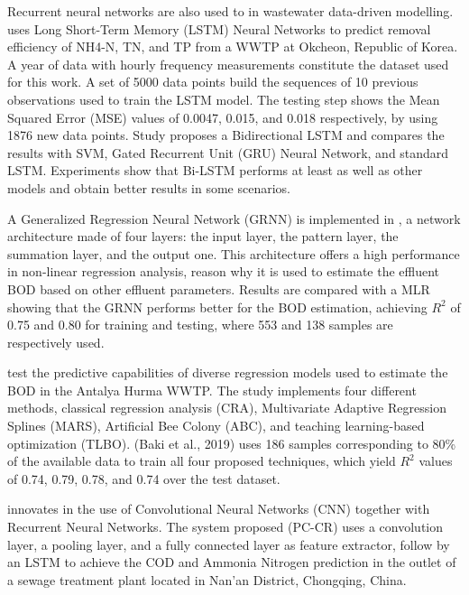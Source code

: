 Recurrent neural networks are also used to in wastewater data-driven modelling. \cite{Yaqub2020} uses Long Short-Term Memory (LSTM) Neural Networks to predict removal efficiency of NH4-N, TN, and TP from a WWTP at Okcheon, Republic of Korea. A year of data with hourly frequency measurements constitute the dataset used for this work. A set of 5000 data points build the sequences of 10 previous observations used to train the LSTM model. The testing step shows the Mean Squared Error (MSE) values of 0.0047, 0.015, and 0.018 respectively, by using 1876 new data points. Study \cite{Kang2020} proposes a Bidirectional LSTM and compares the results with SVM, Gated Recurrent Unit (GRU) Neural Network, and standard LSTM. Experiments show that Bi-LSTM performs at least as well as other models and obtain better results in some scenarios.

A Generalized Regression Neural Network (GRNN) is implemented in \cite{Heddam2016}, a network architecture made of four layers: the input layer, the pattern layer, the summation layer, and the output one. This architecture offers a high performance in non-linear regression analysis, reason why it is used to estimate the effluent BOD based on other effluent parameters. Results are compared with a MLR showing that the GRNN performs better for the BOD estimation, achieving \begin{math}R^2\end{math} of 0.75 and 0.80 for training and testing, where 553 and 138 samples are respectively used. 

\cite{Baki2019} test the predictive capabilities of diverse regression models used to estimate the BOD in the Antalya Hurma WWTP. The study implements four different methods, classical regression analysis (CRA), Multivariate Adaptive Regression Splines (MARS), Artificial Bee Colony (ABC), and teaching learning-based optimization (TLBO). (Baki et al., 2019) uses 186 samples corresponding to 80\% of the available data to train all four proposed techniques, which yield \begin{math}R^2\end{math} values of 0.74, 0.79, 0.78, and 0.74 over the test dataset.

\cite{Guo2020} innovates in the use of Convolutional Neural Networks (CNN) together with Recurrent Neural Networks. The system proposed (PC-CR) uses a convolution layer, a pooling layer, and a fully connected layer as feature extractor, follow by an LSTM to achieve the COD and Ammonia Nitrogen prediction in the outlet of a sewage treatment plant located in Nan'an District, Chongqing, China.


